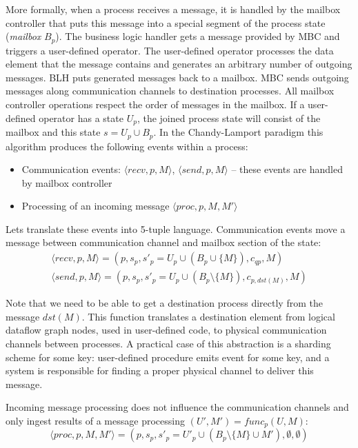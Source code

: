 More formally, when a process receives a message, it is handled by the mailbox controller that puts this message into a special segment of the process state ({\em mailbox} $B_p$). The business logic handler gets a message provided by MBC and triggers a user-defined operator. The user-defined operator processes the data element that the message contains and generates an arbitrary number of outgoing messages. BLH puts generated messages back to a mailbox. MBC sends outgoing messages along communication channels to destination processes. All mailbox controller operations respect the order of messages in the mailbox. If a user-defined operator has a state $U_p$, the joined process state will consist of the mailbox and this state $s=U_p \cup B_p$. In the Chandy-Lamport paradigm this algorithm produces the following events within a process:
\begin{itemize}
    \item Communication events: $\langle recv, p, M\rangle$, $\langle send, p, M \rangle$ -- these events are handled by mailbox controller
    \item Processing of an incoming message $\langle proc, p, M, M' \rangle$
\end{itemize}

Lets translate these events into 5-tuple language. Communication events move a message between communication channel and mailbox section of the state:
\begin{eqnarray}
\langle recv, p, M\rangle = (p, s_p, s'_p = U_p \cup \left(B_p \cup \{M\}\right), c_{qp}, M) \\
\langle send, p, M \rangle = (p, s_p, s'_p = U_p \cup \left(B_p\setminus\{M\}\right), c_{p, dst(M)}, M)
\end{eqnarray}

Note that we need to be able to get a destination process directly from the message $dst(M)$. This function translates a destination element from logical dataflow graph nodes, used in user-defined code, to physical communication channels between processes. A practical case of this abstraction is a sharding scheme for some key: user-defined procedure emits event for some key, and a system is responsible for finding a proper physical channel to deliver this message.

Incoming message processing does not influence the communication channels and only ingest results of a message processing $(U', M') = func_p(U, M)$:
\begin{equation}
    \langle proc, p, M, M' \rangle = (p, s_p, s'_p = U'_p \cup \left(B_p \setminus \{M\} \cup M' \right) , \emptyset, \emptyset)
\end{equation}

